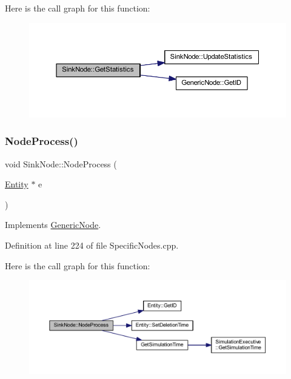 Here is the call graph for this function\+:
\nopagebreak
\begin{figure}[H]
\begin{center}
\leavevmode
\includegraphics[width=350pt]{class_sink_node_ad6aeb0857d3ddd9511cd5d24974e1fac_cgraph}
\end{center}
\end{figure}
\mbox{\label{class_sink_node_a5f3fe2c195c3bb154f27bdf3ae27dd27}} 
\subsubsection{\texorpdfstring{Node\+Process()}{NodeProcess()}}
{\footnotesize\ttfamily void Sink\+Node\+::\+Node\+Process (\begin{DoxyParamCaption}\item[{\hyperlink{class_entity}{Entity} $\ast$}]{e }\end{DoxyParamCaption})\hspace{0.3cm}{\ttfamily [virtual]}}



Implements \hyperlink{class_generic_node_ae942258a57f211072d179da470579add}{Generic\+Node}.



Definition at line 224 of file Specific\+Nodes.\+cpp.

Here is the call graph for this function\+:
\nopagebreak
\begin{figure}[H]
\begin{center}
\leavevmode
\includegraphics[width=350pt]{class_sink_node_a5f3fe2c195c3bb154f27bdf3ae27dd27_cgraph}
\end{center}
\end{figure}
\mbox{\label{class_sink_node_adffbd13ea7f32f79b585b7a8955d1d45}} 
